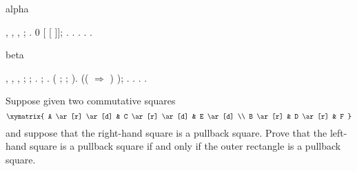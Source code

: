 \begin{coqdoccode}
\coqdocemptyline
\coqdocindent{1.00em}
\begin{coqdoccomment}
\coqdocindent{0.50em}
alpha\coqdocindent{0.50em}
\end{coqdoccomment}
\coqdoceol
\coqdocindent{1.00em}
 , , , ; .\coqdoceol
\coqdocindent{1.00em}
 0  [ [ ]]; . . .\coqdoceol
\coqdocindent{1.00em}
 \coqdocnotation{(} .\coqdoceol
\coqdocindent{1.00em}
 .\coqdoceol
\coqdocemptyline
\coqdocindent{1.00em}
\begin{coqdoccomment}
\coqdocindent{0.50em}
beta\coqdocindent{0.50em}
\end{coqdoccomment}
\coqdoceol
\coqdocindent{1.00em}
 , , , ;  ; .\coqdoceol
\coqdocindent{1.00em}
 ;  .\coqdoceol
\coqdocindent{1.00em}
 ( ; \coqdoctac{\ensuremath{\exists}} ; ).\coqdoceol
\coqdocindent{1.00em}
 \coqdocnotation{(}   ((  \ensuremath{\Rightarrow} \coqdocnotation{(} ) ); .\coqdoceol
\coqdocindent{1.00em}
 .\coqdoceol
\coqdocnoindent
{}.\coqdoceol
\coqdocemptyline
\coqdocnoindent
{} .\coqdoceol
\coqdocemptyline
\end{coqdoccode}
Suppose given two commutative squares
\[\xymatrix{
  A \ar[r] \ar[d] & C \ar[r] \ar[d] & E \ar[d] \\
  B \ar[r] & D \ar[r] & F
}\]
and suppose that the right-hand square is a pullback square.  Prove that the
left-hand square is a pullback square if and only if the outer rectangle is a
pullback square.


